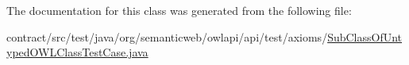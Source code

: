 The documentation for this class was generated from the following file\-:\begin{DoxyCompactItemize}
\item 
contract/src/test/java/org/semanticweb/owlapi/api/test/axioms/\hyperlink{_sub_class_of_untyped_o_w_l_class_test_case_8java}{Sub\-Class\-Of\-Untyped\-O\-W\-L\-Class\-Test\-Case.\-java}\end{DoxyCompactItemize}
